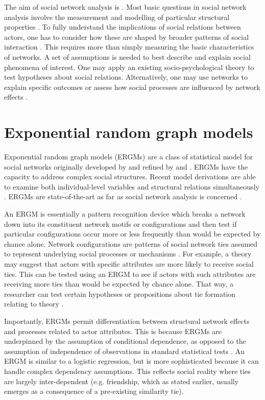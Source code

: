 The aim of social network analysis is  \citep{de2011exploratory}. Most basic questions in social network analysis involve the measurement and modelling of particular structural properties \citep{butts2008social}. To fully understand the implications of social relations between actors, one has to consider how these are shaped by broader patterns of social interaction \citep{scott2011sage}. This requires more than simply measuring the basic characteristics of networks. A set of assumptions is needed to best describe and explain social phenomena of interest. One may apply an existing socio-psychological theory to test hypotheses about social relations. Alternatively, one may use networks to explain specific outcomes or assess how social processes are influenced by network effects \citep{scott2011sage,borgatti2013analyzing}. \medskip

\section{Exponential random graph models}

Exponential random graph models (ERGMs) are a class of statistical model for social networks originally developed by \citet{frank1986markov} and refined by \citet{wasserman1996logit} and \citet{pattison1999logit}. ERGMs have the capacity to address complex social structures. Recent model derivations are able to examine both individual-level variables and structural relations simultaneously \citep{robins2007recent}. ERGMs are state-of-the-art as far as social network analysis is concerned \citep{lusher2013exponential}. \medskip

An ERGM is essentially a pattern recognition device which breaks a network down into its constituent network motifs or configurations and then test if particular configurations occur more or less frequently than would be expected by chance alone. Network configurations are patterns of social network ties assumed to represent underlying social processes or mechanisms \citep{lusher2014cooperative}. For example, a theory may suggest that actors with specific attributes are more likely to receive social ties. This can be tested using an ERGM to see if actors with such attributes are receiving more ties than would be expected by chance alone. That way, a researcher can test certain hypotheses or propositions about tie formation relating to theory \citep{robins2007recent}. \medskip

Importantly, ERGMs permit differentiation between structural network effects and processes related to actor attributes. This is because ERGMs are underpinned by the assumption of conditional dependence, as opposed to the assumption of independence of observations in standard statistical tests \citep{pattison2002neighborhood}. An ERGM is similar to a logistic regression, but is more sophisticated because it can handle complex dependency assumptions. This reflects social reality where ties are largely inter-dependent (e.g. friendship, which as stated earlier, usually emerges as a consequence of a pre-existing similarity tie). \medskip

